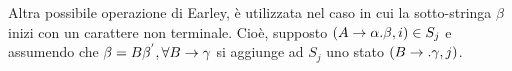 \documentclass{subfiles}
\begin{document}
Altra possibile operazione di Earley, è utilizzata nel caso in cui la sotto-stringa $\beta$ inizi con un carattere non terminale.
Cioè, supposto $(\Grammar{A}{\alpha . \beta} , i) \in S_{j}$ e assumendo che $\beta = B\beta^{'}, \forall \Grammar{B}{\gamma}$ si aggiunge ad $S_{j}$
uno stato $(\Grammar{B}{.\gamma}, j)$.
\end{document}
